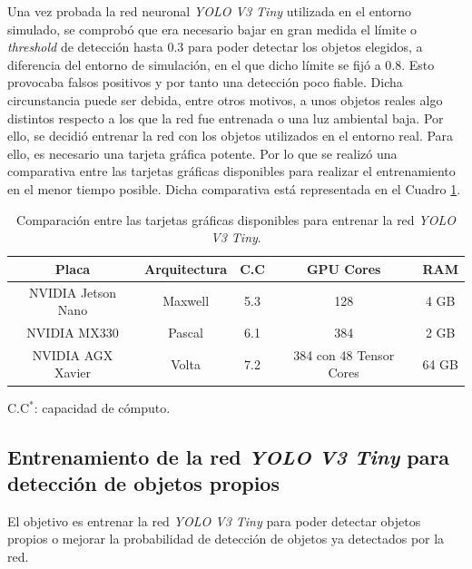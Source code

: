 Una vez probada la red neuronal \textit{YOLO V3 Tiny} utilizada en el entorno simulado, se comprobó que era necesario bajar en gran medida el límite o \textit{threshold} de detección hasta 0.3 para poder detectar los objetos elegidos, a diferencia del entorno de simulación, en el que dicho límite se fijó a 0.8. Esto provocaba falsos positivos y por tanto una detección poco fiable. Dicha circunstancia puede ser debida, entre otros motivos, a unos objetos reales algo distintos respecto a los que la red fue entrenada o una luz ambiental baja. Por ello, se decidió entrenar la red con los objetos utilizados en el entorno real. Para ello, es necesario una tarjeta gráfica potente. Por lo que se realizó una comparativa entre las tarjetas gráficas disponibles para realizar el entrenamiento en el menor tiempo posible. Dicha comparativa está representada en el Cuadro \ref{table:versusnvidia}.\\

\begin{table}[H]
	\begin{center}
		\begin{tabular}{|c|c|c|c|c|}
			\hline
			\textbf{Placa}	& \textbf{Arquitectura} & \textbf{C.C\makebox[0pt][l]{$^*$}} & \textbf{GPU Cores}				& \textbf{RAM}
			\\
			\hline
			NVIDIA Jetson Nano		& Maxwell								& 5.3														& 128												& 4 GB
			\\
			NVIDIA MX330					& Pascal								& 6.1														& 384												& 2 GB
			\\
			NVIDIA AGX Xavier			& Volta									& 7.2														& 384 con 48 Tensor Cores		& 64 GB
			\\
			\hline
		\end{tabular}
		\parbox[t]{\textwidth}{\footnotesize C.C$^*$: capacidad de cómputo.}
		\caption{Comparación entre las tarjetas gráficas disponibles para entrenar la red \textit{YOLO V3 Tiny}.}
		\label{table:versusnvidia}
	\end{center}
\end{table}

\subsection{Entrenamiento de la red \textit{YOLO V3 Tiny} para detección de objetos propios}
El objetivo es entrenar la red \textit{YOLO V3 Tiny} para poder detectar objetos propios o mejorar la probabilidad de detección de objetos ya detectados por la red.\\

